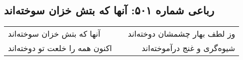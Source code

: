 \begin{center}
\section*{رباعی شماره ۵۰۱: آنها که بتش خزان سوخته‌اند}
\label{sec:0501}
\begin{longtable}{l p{0.5cm} r}
آنها که بتش خزان سوخته‌اند
&&
وز لطف بهار چشمشان دوخته‌اند
\\
اکنون همه را خلعت تو دوخته‌اند
&&
شیوه‌گری و غنج درآموخته‌اند
\\
\end{longtable}
\end{center}
